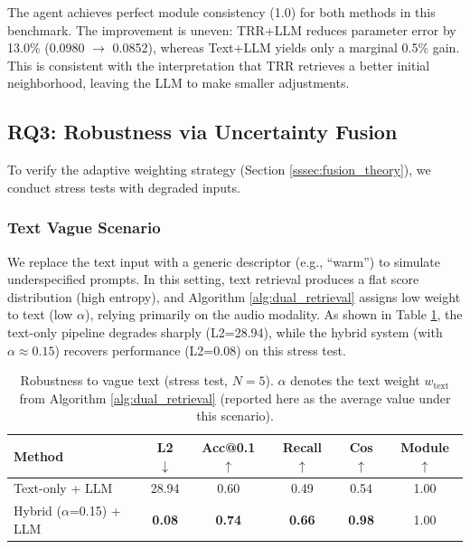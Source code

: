 \documentclass{article}
\begin{document}
	The agent achieves perfect module consistency (1.0) for both methods in this benchmark. The improvement is uneven: TRR+LLM reduces parameter error by 13.0\% (0.0980 $\to$ 0.0852), whereas Text+LLM yields only a marginal 0.5\% gain. This is consistent with the interpretation that TRR retrieves a better initial neighborhood, leaving the LLM to make smaller adjustments.

\subsection{RQ3: Robustness via Uncertainty Fusion}
\label{ssec:robustness}

To verify the adaptive weighting strategy (Section \ref{sssec:fusion_theory}), we conduct stress tests with degraded inputs.

\subsubsection{Text Vague Scenario}
We replace the text input with a generic descriptor (e.g., ``warm'') to simulate underspecified prompts. In this setting, text retrieval produces a flat score distribution (high entropy), and Algorithm \ref{alg:dual_retrieval} assigns low weight to text (low $\alpha$), relying primarily on the audio modality.
As shown in Table \ref{tab:robustness_vague}, the text-only pipeline degrades sharply (L2=28.94), while the hybrid system (with $\alpha \approx 0.15$) recovers performance (L2=0.08) on this stress test.

\begin{table}[h]
	\centering
	\caption{Robustness to vague text (stress test, $N=5$). $\alpha$ denotes the text weight $w_{\text{text}}$ from Algorithm \ref{alg:dual_retrieval} (reported here as the average value under this scenario).}
	\label{tab:robustness_vague}
	\begin{tabular}{lccccc}
		\toprule
		\textbf{Method}                  & \textbf{L2} $\downarrow$ & \textbf{Acc@0.1} $\uparrow$ & \textbf{Recall} $\uparrow$ & \textbf{Cos} $\uparrow$ & \textbf{Module} $\uparrow$ \\
		\midrule
		Text-only + LLM                  & 28.94               & 0.60             & 0.49          & 0.54          & 1.00            \\
		Hybrid ($\alpha$=0.15) + LLM     & \textbf{0.08}        & \textbf{0.74}     & \textbf{0.66}   & \textbf{0.98}   & 1.00            \\
		\bottomrule
	\end{tabular}
\end{table}
\end{document}
